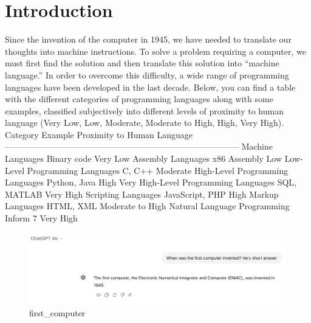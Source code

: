 \section{Introduction}\label{introduction}

Since the invention of the computer in 1945, we have needed to translate
our thoughts into machine instructions. To solve a problem requiring a
computer, we must first find the solution and then translate this
solution into ``machine language.'' In order to overcome this
difficulty, a wide range of programming languages have been developed in
the last decade. Below, you can find a table with the different
categories of programming languages along with some examples, classified
subjectively into different levels of proximity to human language (Very
Low, Low, Moderate, Moderate to High, High, Very High). \textbar{}
Category \textbar{} Example \textbar{} Proximity to Human Language
\textbar{}
\textbar---------------------------------\textbar---------------------\textbar-----------------------------\textbar{}
\textbar{} Machine Languages \textbar{} Binary code \textbar{} Very Low
\textbar{} \textbar{} Assembly Languages \textbar{} x86 Assembly
\textbar{} Low \textbar{} \textbar{} Low-Level Programming Languages
\textbar{} C, C++ \textbar{} Moderate \textbar{} \textbar{} High-Level
Programming Languages\textbar{} Python, Java \textbar{} High \textbar{}
\textbar{} Very High-Level Programming Languages \textbar{} SQL, MATLAB
\textbar{} Very High \textbar{} \textbar{} Scripting Languages
\textbar{} JavaScript, PHP \textbar{} High \textbar{} \textbar{} Markup
Languages \textbar{} HTML, XML \textbar{} Moderate to High \textbar{}
\textbar{} Natural Language Programming \textbar{} Inform 7 \textbar{}
Very High \textbar{}

\begin{figure}
\centering
\includegraphics{images/first_computer.png}
\caption{first\_computer}
\end{figure}

